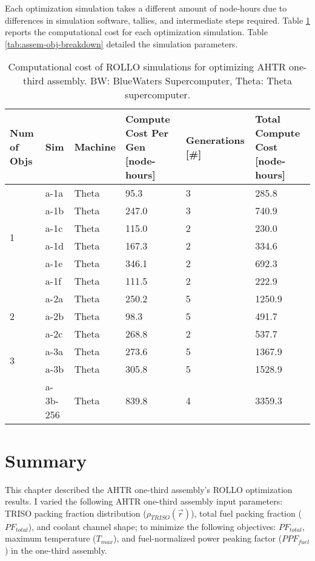 Each optimization simulation takes a different amount of node-hours due to 
differences in simulation software, tallies, and intermediate steps required. 
Table \ref{tab:assem-compute-cost} reports the computational cost for each optimization 
simulation. 
Table \ref{tab:assem-obj-breakdown} detailed the simulation parameters.
\begin{table}[htbp!]
    \centering
    \onehalfspacing
    \caption{Computational cost of \acrfull{ROLLO} simulations for optimizing 
    \acrfull{AHTR} one-third assembly. BW: BlueWaters Supercomputer, Theta: Theta 
    supercomputer.}
	\label{tab:assem-compute-cost}
    \footnotesize
    \begin{tabular}{p{1.4cm}|p{1.5cm}lp{3.5cm}lp{3cm}}
        \hline 
        \textbf{Num of Objs} & \textbf{Sim} & \textbf{Machine} & 
        \textbf{Compute Cost Per Gen [node-hours]} &\textbf{Generations [\#]} & 
        \textbf{Total Compute Cost [node-hours]} \\
        \hline
    \multirow{6}{2cm}{1} 
    & a-1a & Theta &  95.3 & 3 & 285.8 \\
    & a-1b & Theta & 247.0 & 3 & 740.9 \\
    & a-1c & Theta & 115.0 & 2 & 230.0 \\
    & a-1d & Theta & 167.3 & 2 & 334.6 \\
    & a-1e & Theta & 346.1 & 2 & 692.3 \\
    & a-1f & Theta & 111.5 & 2 & 222.9 \\
    \hline
    \multirow{3}{2cm}{2}
    & a-2a & Theta & 250.2 & 5 & 1250.9 \\
    & a-2b & Theta &  98.3 & 5 &  491.7 \\
    & a-2c & Theta & 268.8 & 2 &  537.7 \\
    \hline
    \multirow{2}{2cm}{3}
    & a-3a & Theta & 273.6 & 5 & 1367.9 \\
    & a-3b & Theta & 305.8 & 5 & 1528.9 \\
    & a-3b-256 & Theta & 839.8 & 4 & 3359.3 \\
    \hline
    \end{tabular}
\end{table}

\pagebreak
\section{Summary}
\glsresetall
This chapter described the \gls{AHTR} one-third assembly's \gls{ROLLO} optimization 
results. 
I varied the following \gls{AHTR} one-third assembly input parameters: \gls{TRISO} 
packing fraction distribution ($\rho_{TRISO}(\vec{r})$), total fuel packing fraction 
($PF_{total}$), and coolant channel shape; to minimize the following 
objectives: $PF_{total}$, maximum temperature ($T_{max}$), and fuel-normalized power 
peaking factor ($PPF_{fuel}$) in the one-third assembly. 

